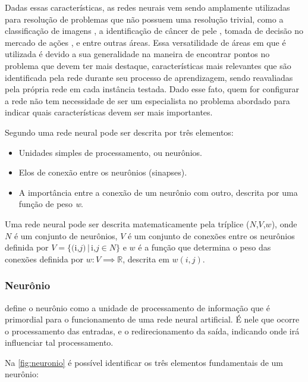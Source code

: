 \par Dadas essas características, as redes neurais vem sendo amplamente utilizadas para resolução de problemas que não possuem uma resolução trivial, como a classificação de imagens \cite{imaginetArticle}, a identificação de câncer de pele \cite{esteva2017dermatologist}, tomada de decisão no mercado de ações \cite{gambogi2013aplicaccao}, e entre outras áreas. Essa versatilidade de áreas em que é utilizada é devido a sua generalidade na maneira de encontrar pontos no problema que devem ter mais destaque, características mais relevantes que são identificada pela rede durante seu processo de aprendizagem, sendo reavaliadas pela própria rede em cada instância testada. Dado esse fato, quem for configurar a rede não tem necessidade de ser um especialista no problema abordado para indicar quais características devem ser mais importantes.
\par Segundo \cite{Kriesel2007NeuralNetworks} uma rede neural pode ser descrita por três elementos:
\begin{itemize}
\item Unidades simples de processamento, ou neurônios.
\item Elos de conexão entre os neurônios (sinapses).
\item A importância entre a conexão de um neurônio com outro, descrita por uma função de peso \textit{w}.
\end{itemize}
\par Uma rede neural pode ser descrita matematicamente pela tríplice ($N$,$V$,$w$), onde $N$ é um conjunto de neurônios, $V$ é um conjunto de conexões entre os neurônios definida por $V = \{($i,$j) \,|\, $i,$j \in N \}$ e $w$ é a função que determina o peso das conexões definida por $w: V \implies \mathbb{R}$, descrita em $w(i,j)$.
\subsubsection{Neurônio}
\cite{haykin2001} define o neurônio como a unidade de processamento de informação que é primordial para o funcionamento de uma rede neural artificial. É nele que ocorre o processamento das entradas, e o redirecionamento da saída, indicando onde irá influenciar tal processamento.
\par Na \autoref{fig:neuronio} é possível identificar os três elementos fundamentais de um neurônio:

